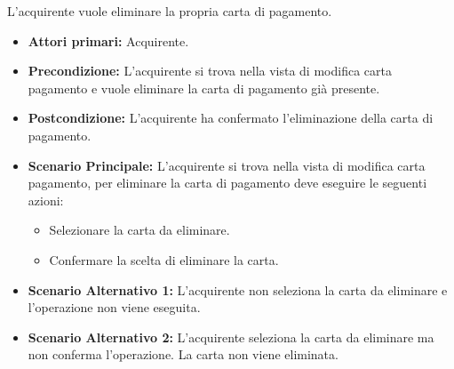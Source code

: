 L'acquirente vuole eliminare la propria carta di pagamento.
\begin{itemize}
    \item \textbf{Attori primari:} Acquirente.
    \item \textbf{Precondizione:} L'acquirente si trova nella vista di modifica carta pagamento e vuole eliminare la carta di pagamento già presente.
    \item \textbf{Postcondizione:} L'acquirente ha confermato l'eliminazione della carta di pagamento.
    \item \textbf{Scenario Principale:} L'acquirente si trova nella vista di modifica carta pagamento, per eliminare la carta di pagamento deve eseguire le seguenti azioni:
        \begin{itemize}
            \item Selezionare la carta da eliminare.
            \item Confermare la scelta di eliminare la carta.
        \end{itemize}
    \item \textbf{Scenario Alternativo 1:} L'acquirente non seleziona la carta da eliminare e l'operazione non viene eseguita.
    \item \textbf{Scenario Alternativo 2:} L'acquirente seleziona la carta da eliminare ma non conferma l'operazione. La carta non viene eliminata.
\end{itemize}

